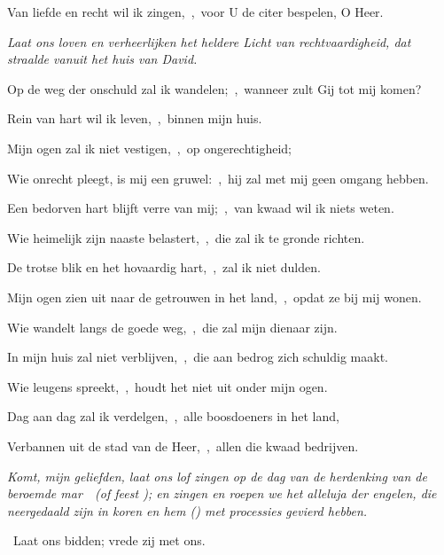 \documentclass[12pt,twoside,a5paper]{article}
\begin{document}
\begin{halfparskip}
  Van liefde en recht wil ik zingen,~\sep\ voor U de citer bespelen, O Heer.


  \liturgicallbracket{} \emph{Laat ons loven en verheerlijken het heldere Licht van rechtvaardigheid, dat straalde vanuit het huis van David.}\liturgicalrbracket

  Op de weg der onschuld zal ik wandelen;~\sep\ wanneer zult Gij tot mij komen?

  Rein van hart wil ik leven,~\sep\ binnen mijn huis.

  Mijn ogen zal ik niet vestigen,~\sep\ op ongerechtigheid;

  Wie onrecht pleegt, is mij een gruwel:~\sep\ hij zal met mij geen omgang hebben.

  Een bedorven hart blijft verre van mij;~\sep\ van kwaad wil ik niets weten.

  Wie heimelijk zijn naaste belastert,~\sep\ die zal ik te gronde richten.

  De trotse blik en het hovaardig hart,~\sep\ zal ik niet dulden.

  Mijn ogen zien uit naar de getrouwen in het land,~\sep\ opdat ze bij mij wonen.

  Wie wandelt langs de goede weg,~\sep\ die zal mijn dienaar zijn.

  In mijn huis zal niet verblijven,~\sep\ die aan bedrog zich schuldig maakt.

  Wie leugens spreekt,~\sep\ houdt het niet uit onder mijn ogen.

  Dag aan dag zal ik verdelgen,~\sep\ alle boosdoeners in het land,

  Verbannen uit de stad van de Heer,~\sep\ allen die kwaad bedrijven.

   \emph{Komt, mijn geliefden, laat ons lof zingen op de dag van de herdenking van de beroemde mar~\NN\ (of feest \NN ); en zingen en roepen we het alleluja der engelen, die neergedaald zijn in koren en hem () met processies gevierd hebben.}
\end{halfparskip}

\begin{halfparskip}
  \dd~Laat ons bidden; vrede zij met ons.
\end{halfparskip}
\end{document}
